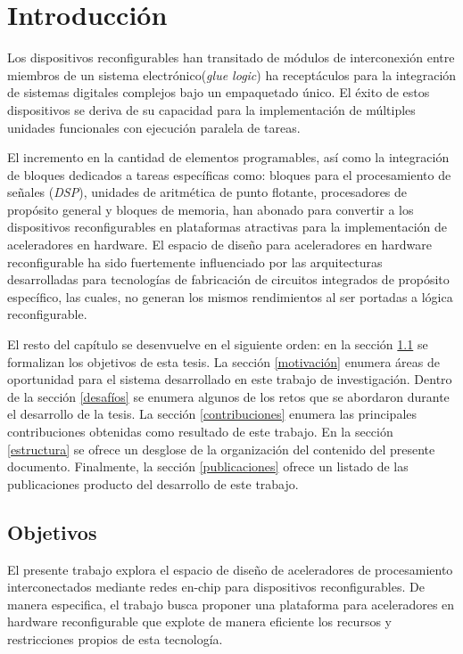 \chapter{Introducción}
	\label{introduccion}

	Los dispositivos reconfigurables han transitado de módulos de interconexión entre miembros de un sistema electrónico(\textit{glue logic}) ha receptáculos para la integración de sistemas digitales complejos bajo un empaquetado único. El éxito de estos dispositivos se deriva de su capacidad para la implementación de múltiples unidades funcionales con ejecución paralela de tareas.

	El incremento en la cantidad de elementos programables, así como la integración de bloques dedicados a tareas específicas como: bloques para el procesamiento de señales (\textit{DSP}), unidades de aritmética de punto flotante, procesadores de propósito general y bloques de memoria, han abonado para convertir a los dispositivos reconfigurables en plataformas atractivas para la implementación de aceleradores en hardware. El espacio de diseño para aceleradores en hardware reconfigurable ha sido fuertemente influenciado por las arquitecturas desarrolladas para tecnologías de fabricación de circuitos integrados de propósito específico, las cuales, no generan los mismos rendimientos al ser portadas a lógica reconfigurable.

	El resto del capítulo se desenvuelve en el siguiente orden: en la sección \ref{objetivos} se formalizan los objetivos de esta tesis. La sección \ref{motivación} enumera áreas de oportunidad para el sistema desarrollado en este trabajo de investigación. Dentro de la sección \ref{desafíos} se enumera algunos de los retos que se abordaron durante el desarrollo de la tesis. La sección \ref{contribuciones} enumera las principales contribuciones obtenidas como resultado de este trabajo. En la sección \ref{estructura} se ofrece un desglose de la organización del contenido del presente documento. Finalmente, la sección \ref{publicaciones} ofrece un listado de las publicaciones producto del desarrollo de este trabajo.


\section{Objetivos}
	\label{objetivos}
	
	El presente trabajo explora el espacio de diseño de aceleradores de procesamiento interconectados mediante redes en-chip para dispositivos reconfigurables. De manera especifica, el trabajo busca proponer una plataforma para aceleradores en hardware reconfigurable que explote de manera eficiente los recursos y restricciones propios de esta tecnología.

